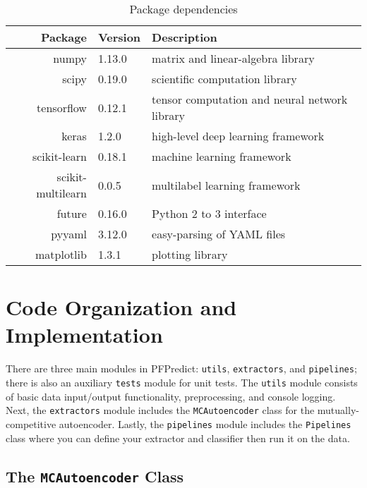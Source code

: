 \begin{table}[!h]
\centering
\caption{Package dependencies}
\label{my-label}
\begin{tabular}{@{}rlp{}@{}}
\toprule
Package           & Version & Description                                    \\ \midrule
numpy             & 1.13.0  & matrix and linear-algebra library              \\
scipy             & 0.19.0  & scientific computation library                 \\
tensorflow        & 0.12.1  & tensor computation and neural network library  \\
keras             & 1.2.0   & high-level deep learning framework             \\
scikit-learn      & 0.18.1  & machine learning framework                     \\
scikit-multilearn & 0.0.5   & multilabel learning framework                  \\
future            & 0.16.0  & Python 2 to 3 interface                        \\
pyyaml            & 3.12.0  & easy-parsing of YAML files                     \\
matplotlib        & 1.3.1   & plotting library                               \\ \bottomrule
\end{tabular}
\end{table}


\section{Code Organization and Implementation}

\par There are three main modules in PFPredict: \texttt{utils},
\texttt{extractors}, and \texttt{pipelines}; there is also an auxiliary
\texttt{tests} module for unit tests. The \texttt{utils} module consists of
basic data input/output functionality, preprocessing, and console logging.
Next, the \texttt{extractors} module includes the \texttt{MCAutoencoder} class
for the mutually-competitive autoencoder. Lastly, the \texttt{pipelines} module
includes the \texttt{Pipelines} class where you can define your extractor and
classifier then run it on the data.

\subsection{The \texttt{MCAutoencoder} Class}

